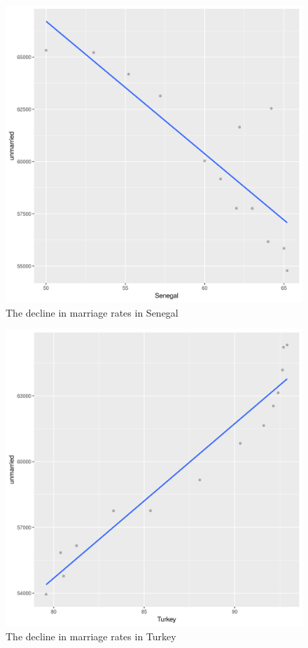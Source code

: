 \documentclass[12pt]{article}
\begin{document}
\begin{figure}[h!]
\caption{The decline in marriage rates in Senegal}
\centering
\includegraphics[scale=.5]{quest1Senegal.png}
\end{figure}
 \clearpage

\begin{figure}[h!]
\caption{The decline in marriage rates in Turkey}
\centering
\includegraphics[scale=.5]{quest1Turkey.png}
\end{figure}
 \clearpage
\end{document}
